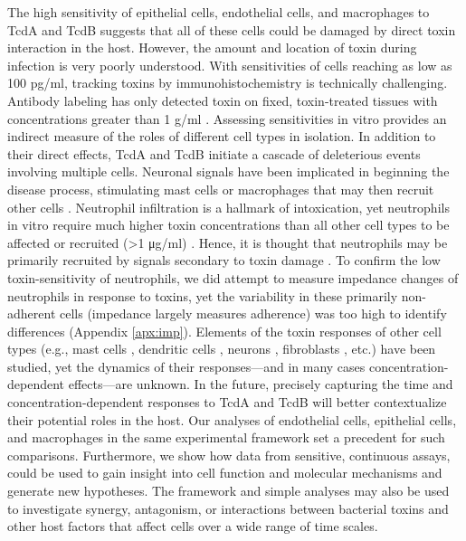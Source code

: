 The high sensitivity of epithelial cells, endothelial cells, 
and macrophages to TcdA and TcdB suggests that all of 
these cells could be damaged by direct toxin interaction 
in the host. However, the amount and location of toxin 
during infection is very poorly understood. With 
sensitivities of cells reaching as low as 100 pg/ml, 
tracking toxins by immunohistochemistry is technically 
challenging. Antibody labeling has only detected toxin 
on fixed, toxin-treated tissues with concentrations 
greater than 1 \textmugreek{}g/ml \cite{Keel:2007jh}. Assessing sensitivities 
in vitro provides an indirect measure of the roles of 
different cell types in isolation. In addition to their 
direct effects, TcdA and TcdB initiate a cascade of 
deleterious events involving multiple cells. Neuronal 
signals have been implicated in beginning the disease 
process, stimulating mast cells or macrophages that may then 
recruit other cells 
\cite{Sorensson:2001da,Pothoulakis:1998vc,
Castagliuolo:1998fu,Castagliuolo:1994ta}. 
Neutrophil infiltration is a 
hallmark of intoxication, yet neutrophils in vitro require 
much higher toxin concentrations than all other cell types 
to be affected or recruited (>1 μg/ml) 
\cite{Kelly:1994cu,Brito:2002kq,Shah:1991ww,Pothoulakis:1988dk,Dailey:1987vo}. 
Hence, it is thought that neutrophils may be primarily 
recruited by signals secondary to toxin 
damage \cite{Kelly:1994cu,Sun:2010kt,Voth:2005di}. 
To confirm the low toxin-sensitivity of neutrophils, we 
did attempt to measure impedance changes of neutrophils 
in response to toxins, yet the variability in these 
primarily non-adherent cells (impedance largely measures adherence) 
was too high to identify differences (Appendix \autoref{apx:imp}). 
Elements of the toxin responses of other cell types 
(e.g., mast cells \cite{Meyer:2007kj,Calderon:1998tr,Gerhard:2011hm}, 
dendritic cells \cite{Lee:2008jf,Jafari:2013ji}, 
neurons \cite{Xia:2000gg,Neunlist:2003ba}, 
fibroblasts \cite{Wedel:1983vd,ChavesOlarte:1996jy}, etc.) have been 
studied, yet the dynamics of their responses—and in many 
cases concentration-dependent effects—are unknown. In the 
future, precisely capturing the time and concentration-dependent 
responses to TcdA and TcdB will better contextualize their 
potential roles in the host. Our analyses of endothelial 
cells, epithelial cells, and macrophages in the same 
experimental framework set a precedent for such comparisons. 
Furthermore, we show how data from sensitive, continuous 
assays, could be used to gain insight into cell function 
and molecular mechanisms and generate new hypotheses. The 
framework and simple analyses may also be used to investigate 
synergy, antagonism, or interactions between bacterial toxins 
and other host factors that affect cells over a wide range of 
time scales.


